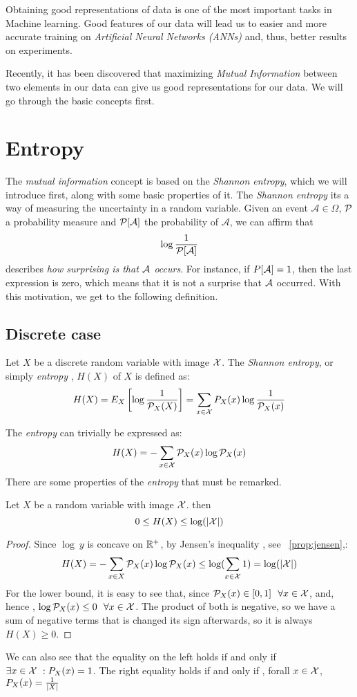 Obtaining good representations of data is one of the most important tasks in Machine learning. Good features of our data will lead us to easier and more accurate training on \emph{Artificial Neural Networks (ANNs)} and, thus, better results on experiments.

Recently, it has been discovered that maximizing \emph{Mutual Information} between two elements in our data can give us good representations for our data. We will go through the basic concepts first.


\section{Entropy}

The \emph{mutual information} concept is based on the \emph{Shannon entropy}, which we will introduce first, along with some basic properties of it. The \emph{Shannon entropy} its a way of measuring the uncertainty in a random variable. Given an event $\mathcal A \in \Omega$, $\mathcal{P}$ a probability measure and $\mathcal{P}[\mathcal A]$ the probability of $\mathcal A$, we can affirm that 
$$
\log\frac{1}{\mathcal{P}[\mathcal A]}
$$
describes \emph{how surprising is that $\mathcal A$ occurs}. For instance, if $P[\mathcal A] = 1$, then the last expression is zero, which means that it is not a surprise that $\mathcal A$ occurred. With this motivation, we get to the following definition.

\subsection{Discrete case}

\begin{ndef}
Let $X$ be a discrete random variable with image $\mathcal{X}$. The \emph{Shannon entropy}, or simply \emph{entropy} , $H(X)$ of $X$ is defined as:
$$
H(X) = E_X\left[\log\frac{1}{\mathcal{P}_X(X)}\right] =  \sum_{x \in \mathcal{X}} P_X(x) \log\frac{1}{\mathcal{P}_X(x)}
$$
\end{ndef}
The \emph{entropy} can trivially be expressed as:
$$
H(X) = - \sum_{x \in \mathcal{X}}\mathcal{P}_X (x)\log \mathcal{P}_X(x)
$$
There are some properties of the \emph{entropy} that must be remarked. 
\begin{nprop}\label{entr:prop:1}
    Let $X$ be a random variable with image $\mathcal{X}$. then
    $$
0 \leq H(X) \leq \log(|\mathcal{X}|)
    $$
\end{nprop}
\begin{proof}
    Since $\log \ y$ is concave on $\mathbb{R}^+$, by Jensen's inequality , see ~\ref{prop:jensen},:
    $$
    H(X) = - \sum_{x \in X}\mathcal{P}_X (x)\log \mathcal{P}_X(x) \leq \log(\sum_{x \in \mathcal{X}} 1) = \log(|\mathcal{X}|)
    $$
    For the lower bound, it is easy to see that, since $\mathcal{P}_X(x) \in [0,1] \ \  \forall x \in \mathcal{X} $, and, hence , $\log \mathcal{P}_X(x) \leq 0 \ \ \forall x \in \mathcal{X}$. The product of both is negative, so we have a sum of negative terms that is changed its sign afterwards, so it is always $H(X) \geq 0$. 
\end{proof}
We can also see that the equality on the left holds if and only if $\exists x \in \mathcal{X} \ : P_X(x) = 1$. The right equality holds if and only if , forall $x \in \mathcal{X}$, $P_X(x) = \frac{1}{\lvert X\rvert}$

